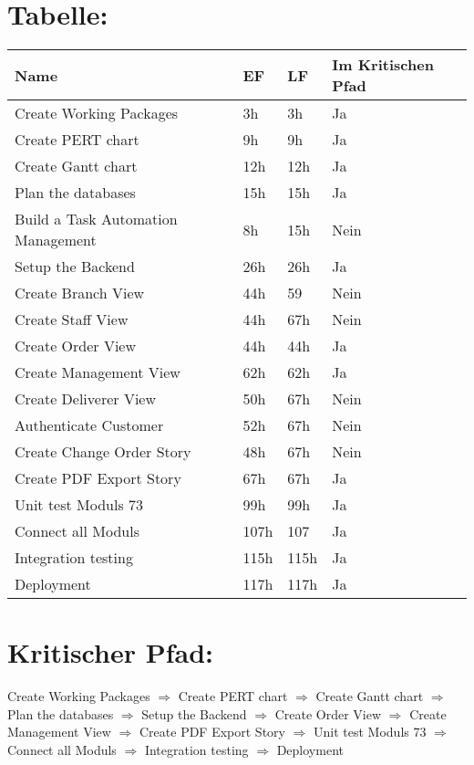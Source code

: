 \documentclass[11pt,a4paper]{article}
\begin{document}
\section*{Tabelle:}
\begin{tabular}{l|lll}
	Name								&EF		&LF		&Im Kritischen Pfad\\
	\hline
    Create Working Packages				&3h		&3h		&Ja\\
    Create PERT chart					&9h		&9h		&Ja\\
    Create Gantt chart					&12h	&12h	&Ja\\
    Plan the databases					&15h	&15h	&Ja\\
    Build a Task Automation Management	&8h		&15h	&Nein\\
    Setup the Backend					&26h	&26h	&Ja\\
    Create Branch View					&44h	&59		&Nein\\
    Create Staff View					&44h	&67h	&Nein\\
    Create Order View					&44h	&44h	&Ja\\
    Create Management View				&62h	&62h	&Ja\\
    Create Deliverer View				&50h	&67h	&Nein\\
    Authenticate Customer				&52h	&67h	&Nein\\
    Create Change Order Story			&48h	&67h	&Nein\\
    Create PDF Export Story				&67h	&67h	&Ja\\
    Unit test Moduls 73					&99h	&99h	&Ja\\
    Connect all Moduls					&107h	&107	&Ja\\
    Integration testing					&115h	&115h	&Ja\\
    Deployment							&117h	&117h	&Ja
\end{tabular}
\section*{Kritischer Pfad:}
Create Working Packages $\Rightarrow$ Create PERT chart $\Rightarrow$ Create Gantt chart $\Rightarrow$ Plan the databases $\Rightarrow$ Setup the Backend $\Rightarrow$ Create Order View $\Rightarrow$ Create Management View $\Rightarrow$ Create PDF Export Story $\Rightarrow$ Unit test Moduls 73 $\Rightarrow$ Connect all Moduls $\Rightarrow$ Integration testing $\Rightarrow$ Deployment
\end{document}
